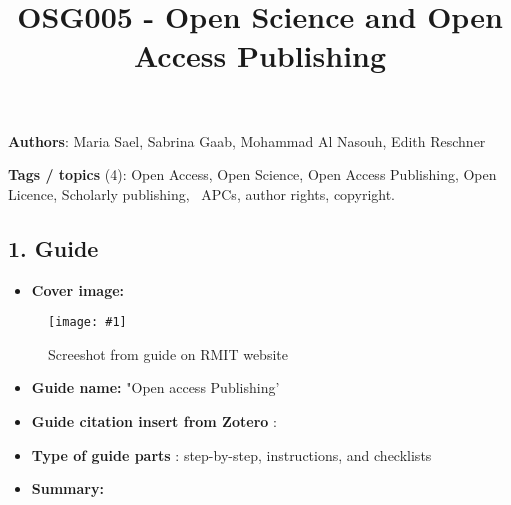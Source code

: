 \documentclass{article}
\newlength{\imgwidth}
\newcommand\scaledgraphics[2]{%
                
\settowidth{\imgwidth}{\texttt{[image: \#1]}}%
                
\setlength{\imgwidth}{\minof{\imgwidth}{#2\textwidth}}%
                
\texttt{[image: \#1]}%
                
}
\begin{document}
\title{OSG005 - Open Science and Open Access Publishing }

\maketitle





\textbf{Authors}:  Maria Sael, Sabrina Gaab, Mohammad Al Nasouh, Edith Reschner


\textbf{Tags / topics} (4): Open Access, Open Science, Open Access Publishing, Open Licence, Scholarly publishing,  APCs, author rights, copyright.


\subsection{1. Guide }\label{H7151279}


\begin{itemize}
\item \textbf{Cover image:} 


\end{itemize}
\begin{figure}
\scaledgraphics{add6dfd7-ef0a-49dc-b0a6-7ae1e4e54339.png}{1}
\caption*{Screeshot from guide on RMIT website}\label{F87257141}
\end{figure}




\begin{itemize}
\item \textbf{Guide name:} "Open access Publishing'


\item \textbf{Guide citation insert from Zotero} :  \autocite{macvean_all_2021} 


\item \textbf{Type of guide parts} : step-by-step, instructions, and checklists 


\item \textbf{Summary:} 


\end{itemize}
\end{document}
